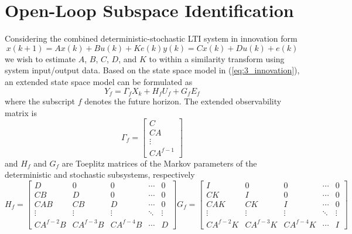 \section{Open-Loop Subspace Identification}
Considering the combined deterministic-stochastic LTI system in innovation form
\begin{subequations}\label{eq:3_innovation}
\begin{equation}x(k+1) = Ax(k) + Bu(k) + Ke(k)\end{equation}
\begin{equation}y(k) = Cx(k) + Du(k) + e(k)\end{equation}
\end{subequations}
we wish to estimate $A$, $B$, $C$, $D$, and $K$ to within a similarity transform using system input/output data. Based on the state space model in (\ref{eq:3_innovation}), an extended state space model can be formulated as
\begin{equation}\label{eq:3_extended_state_space}
Y_f = \Gamma_f X_k + H_f U_f + G_f E_f
\end{equation}
where the subscript $f$ denotes the future horizon. The extended observability matrix is
\begin{equation}\label{eq:3_extended_observability}
\Gamma_f = \begin{bmatrix}C\\ CA\\ \vdots\\ CA^{f-1}\end{bmatrix}
\end{equation}
and $H_f$ and $G_f$ are Toeplitz matrices of the Markov parameters of the deterministic and stochastic subsystems, respectively
\begin{subequations}\label{eq:3_toeplitz}
\begin{equation}
H_f = \begin{bmatrix}
D & 0 & 0 & \cdots & 0\\
CB & D & 0 & \cdots & 0\\
CAB & CB & D & \cdots & 0\\
\vdots & \vdots  & \vdots & \ddots & \vdots\\
CA^{f-2}B & CA^{f-3}B & CA^{f-4}B & \cdots & D
\end{bmatrix}
\end{equation}
\begin{equation}
G_f = \begin{bmatrix}
I & 0 & 0 & \cdots & 0\\
CK & I & 0 & \cdots & 0\\
CAK & CK & I & \cdots & 0\\
\vdots & \vdots  & \vdots & \ddots & \vdots\\
CA^{f-2}K & CA^{f-3}K & CA^{f-4}K & \cdots & I
\end{bmatrix}
\end{equation}
\end{subequations}
